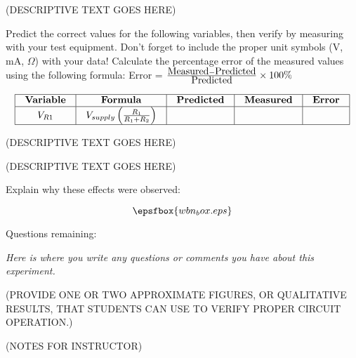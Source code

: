 (DESCRIPTIVE TEXT GOES HERE)

Predict the correct values for the following variables, then verify by measuring with your test equipment.  Don't forget to include the proper unit symbols (V, mA, $\Omega$) with your data!  Calculate the percentage error of the measured values using the following formula: Error = ${\hbox{Measured} - \hbox{Predicted} \over \hbox{Predicted}} \times 100 \%$


$$\vbox{\offinterlineskip
\halign{\strut
\vrule \quad\hfil # \ \hfil & 
\vrule \quad\hfil # \ \hfil & 
\vrule \quad\hfil # \ \hfil & 
\vrule \quad\hfil # \ \hfil & 
\vrule \quad\hfil # \ \hfil \vrule \cr 
\noalign{\hrule}
%
{\bf Variable} & {\bf Formula} & {\bf Predicted} & {\bf Measured} & {\bf Error} \cr
\noalign{\hrule}
%
$V_{R1}$  &  $V_{supply}\left( R_1 \over {R_1 + R_2}\right)$  &   &   &   \cr
\noalign{\hrule}
} %
}$$ %

(DESCRIPTIVE TEXT GOES HERE)

(DESCRIPTIVE TEXT GOES HERE)

Explain why these effects were observed:

$$\epsfbox{wbn_box.eps}$$

\vskip 10pt

\goodbreak

\noindent Questions remaining:

{\it Here is where you write any questions or comments you have about this experiment.}

\vskip 50pt








(PROVIDE ONE OR TWO APPROXIMATE FIGURES, OR QUALITATIVE RESULTS, THAT STUDENTS CAN USE TO VERIFY PROPER CIRCUIT OPERATION.)







(NOTES FOR INSTRUCTOR)



